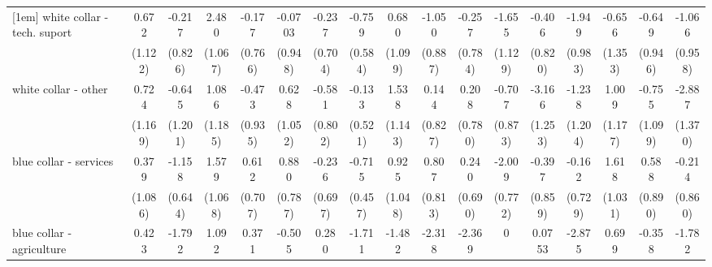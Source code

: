 {\begin{tabular}{l*{16}{c}}
[1em]
white collar - tech. suport&       0.672         &      -0.217         &       2.480\sym{*}  &      -0.177         &     -0.0703         &      -0.237         &      -0.759         &       0.680         &      -1.050         &      -0.257         &      -1.655         &      -0.406         &      -1.949\sym{*}  &      -0.656         &      -0.649         &      -1.066         \\
                    &     (1.122)         &     (0.826)         &     (1.067)         &     (0.766)         &     (0.948)         &     (0.704)         &     (0.584)         &     (1.099)         &     (0.887)         &     (0.784)         &     (1.129)         &     (0.820)         &     (0.983)         &     (1.353)         &     (0.946)         &     (0.958)         \\
[1em]
white collar - other&       0.724         &      -0.645         &       1.086         &      -0.473         &       0.628         &      -0.581         &      -0.133         &       1.538         &       0.144         &       0.208         &      -0.707         &      -3.166\sym{*}  &      -1.238         &       1.009         &      -0.755         &      -2.887\sym{*}  \\
                    &     (1.169)         &     (1.201)         &     (1.185)         &     (0.935)         &     (1.052)         &     (0.802)         &     (0.521)         &     (1.143)         &     (0.827)         &     (0.780)         &     (0.873)         &     (1.253)         &     (1.204)         &     (1.177)         &     (1.099)         &     (1.370)         \\
[1em]
blue collar - services&       0.379         &      -1.158         &       1.579         &       0.612         &       0.880         &      -0.236         &      -0.715         &       0.925         &       0.807         &       0.240         &      -2.009\sym{**} &      -0.397         &      -0.162         &       1.618         &       0.588         &      -0.214         \\
                    &     (1.086)         &     (0.644)         &     (1.068)         &     (0.707)         &     (0.787)         &     (0.697)         &     (0.457)         &     (1.048)         &     (0.813)         &     (0.690)         &     (0.772)         &     (0.859)         &     (0.729)         &     (1.031)         &     (0.890)         &     (0.860)         \\
[1em]
blue collar - agriculture&       0.423         &      -1.792         &       1.092         &       0.371         &      -0.505         &       0.280         &      -1.711\sym{*}  &      -1.482         &      -2.318         &      -2.369\sym{*}  &           0         &      0.0753         &      -2.875\sym{*}  &       0.699         &      -0.358         &      -1.782         \\

\end{tabular}}

